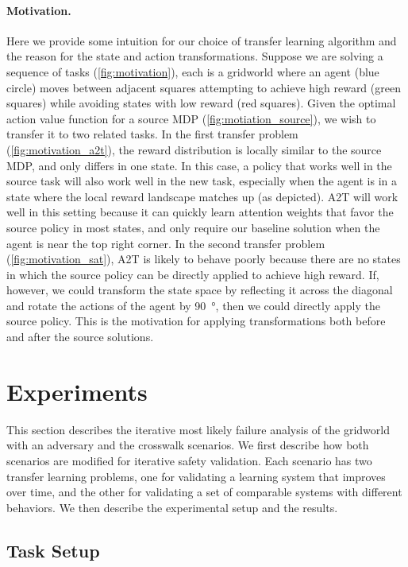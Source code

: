 \paragraph{Motivation.} Here we provide some intuition for our choice of transfer learning algorithm and the reason for the state and action transformations. Suppose we are solving a sequence of tasks (\cref{fig:motivation}), each is a gridworld where an agent (blue circle) moves between adjacent squares attempting to achieve high reward (green squares) while avoiding states with low reward (red squares). Given the optimal action value function for a source MDP (\cref{fig:motiation_source}), we wish to transfer it to two related tasks. In the first transfer problem (\cref{fig:motivation_a2t}), the reward distribution is locally similar to the source MDP, and only differs in one state. In this case, a policy that works well in the source task will also work well in the new task, especially when the agent is in a state where the local reward landscape matches up (as depicted). A2T will work well in this setting because it can quickly learn attention weights that favor the source policy in most states, and only require our baseline solution when the agent is near the top right corner. In the second transfer problem (\cref{fig:motivation_sat}), A2T is likely to behave poorly because there are no states in which the source policy can be directly applied to achieve high reward. If, however, we could transform the state space by reflecting it across the diagonal and rotate the actions of the agent by \SI{90}{\degree}, then we could directly apply the source policy. This is the motivation for applying transformations both before and after the source solutions. 


\section{Experiments}

This section describes the iterative most likely failure analysis of the gridworld with an adversary and the crosswalk scenarios. We first describe how both scenarios are modified for iterative safety validation. Each scenario has two transfer learning problems, one for validating a learning system that improves over time, and the other for validating a set of comparable systems with different behaviors. We then describe the experimental setup and the results. 


\subsection{Task Setup}

